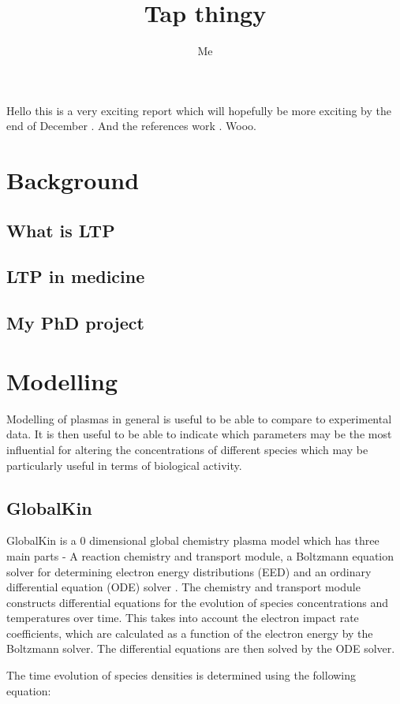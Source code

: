 \documentclass[11pt, oneside]{article}   	%
\title{Tap thingy}
\author{Me}
\begin{document}
\maketitle

Hello this is a very exciting report which will hopefully be more exciting by the end of December \cite{Weltmann2009}. And the references work \cite{Schroter2015atomic}. Wooo.

\section{Background}
\subsection{What is LTP}
\subsection{LTP in medicine}
\subsection{My PhD project}

\section{Modelling}
Modelling of plasmas in general is useful to be able to compare to experimental data. 
It is then useful to be able to indicate which parameters may be the most influential for altering the concentrations of different species which may be particularly useful in terms of biological activity.

\subsection{GlobalKin}
GlobalKin is a 0 dimensional global chemistry plasma model which has three main parts - A reaction chemistry and transport module, a Boltzmann equation solver for determining electron energy distributions (EED) and an ordinary differential equation (ODE) solver \cite{Stafford2004O2}.
The chemistry and transport module constructs differential equations for the evolution of species concentrations and temperatures over time. 
This takes into account the electron impact rate coefficients, which are calculated as a function of the electron energy by the Boltzmann solver.
The differential equations are then solved by the ODE solver.

The time evolution of species densities is determined using the following equation:
\end{document}
